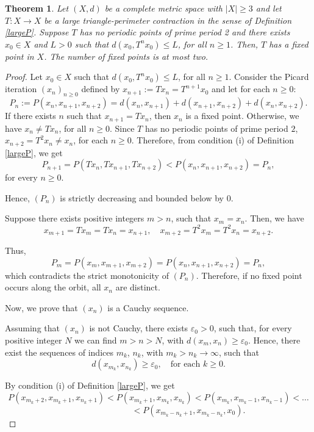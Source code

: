 \documentclass[10pt,a4paper]{amsart}
\newtheorem{theorem}{Theorem}
\begin{document}
	\begin{theorem}
		Let $(X,d)$ be a complete metric space with  $|X|\geq 3$ and let $T \colon X\to X$ be a large triangle-perimeter contraction in the sense of Definition \ref{largeP}. Suppose \(T\) has no periodic points of prime period 2 and there exists $x_0 \in X$ and \(L>0\) such that \(d(x_0, T^nx_0)\leq L \), for all \(n \geq 1\). Then, \(T\) has a fixed point in \(X\). The number of fixed points is at most two.
	\end{theorem}

	\begin{proof}
		Let \(x_0 \in X\) such that \(d(x_0, T^nx_0)\leq L \), for all \(n \geq 1\). Consider the Picard iteration \((x_n)_{n\geq 0}\) defined by \(x_{n+1}:=Tx_n=T^{n+1}x_0\) and let for each \(n \geq 0\):
	\[P_n:= P(x_n, x_{n+1}, x_{n+2}) = d(x_n,x_{n+1})+d(x_{n+1},x_{n+2})+d(x_n,x_{n+2}).\]
		If there exists \(n\) such that $x_{n+1}=Tx_n$, then \(x_n\) is a fixed point. Otherwise, we have \(x_n\neq Tx_n\), for all \(n \geq 0\). Since $T$ has no periodic points of prime period \(2\), \(x_{n+2}=T^2x_n \neq x_n\), for each $n \geq 0$. Therefore, from condition (i) of Definition \ref{largeP}, we get 
	\[P_{n+1} = P(Tx_n, Tx_{n+1}, Tx_{n+2}) < P(x_n, x_{n+1}, x_{n+2}) = P_n,\]
		for every $n \geq 0$.
		
		Hence, \((P_n)\) is strictly decreasing and bounded below by \(0\).
		
		Suppose there exists positive integers \(m>n\), such that \(x_m=x_n\). Then, we have
		\[ x_{m+1} = Tx_m = Tx_n = x_{n+1}, \quad x_{m+2} = T^2x_m = T^2x_n = x_{n+2}. \]
		
		Thus, 
		\[ P_m = P(x_m, x_{m+1}, x_{m+2}) = P(x_n, x_{n+1}, x_{n+2}) = P_n, \]
		which contradicts the strict monotonicity of \((P_n)\). Therefore, if no fixed point occurs along the orbit, all \(x_n\) are distinct.
		
		Now, we prove that \((x_n)\) is a Cauchy sequence.
		
		Assuming that \((x_n)\) is not Cauchy, there exists \(\varepsilon_0 > 0\), such that, for every positive integer \(N\) we can find \(m > n > N\), with \(d(x_m,x_n) \geq \varepsilon_0\). Hence, there exist the sequences of indices \(m_k\), \(n_k\), with \(m_k>n_k \to \infty\), such that
		\[d(x_{m_k}, x_{n_k})\geq \varepsilon_0, \quad \text{for each } k \geq 0. \]
		
		By condition (i) of Definition \ref{largeP}, we get 
		\[P(x_{m_k+2}, x_{m_k+1}, x_{n_k+1}) < P(x_{m_k+1}, x_{m_k}, x_{n_k}) < P(x_{m_k}, x_{m_k-1}, x_{n_k-1}) < \dots \]
		\[\quad \qquad \qquad \qquad < P(x_{m_k-n_k+1}, x_{m_k-n_k}, x_{0}).\]
		

\end{proof}
\end{document}
